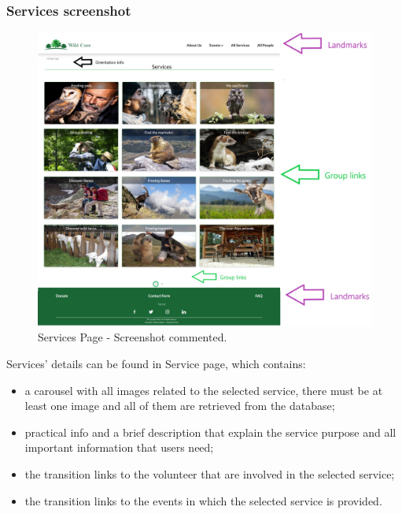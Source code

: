 \subsubsection{Services screenshot}
\begin{figure}[h!]
	\centering
	\begin{minipage}[b]{1\textwidth}
    		\includegraphics[width=\textwidth]{./assets/mockups/services_commented.jpg}
		\caption{Services Page - Screenshot commented.}
	\end{minipage}
\end{figure}
\FloatBarrier

\vspace{1cm}
\hspace{-1cm}
Services' details can be found in Service page, which contains:
\begin{itemize}
	\item a carousel with all images related to the selected service, there must be at least one image and all of them are retrieved 			from the database;
	\item practical info and a brief description that explain the service purpose and all important information that users need;
	\item the transition links to the volunteer that are involved in the selected service;
	\item the transition links to the events in which the selected service is provided.
\end{itemize} 

